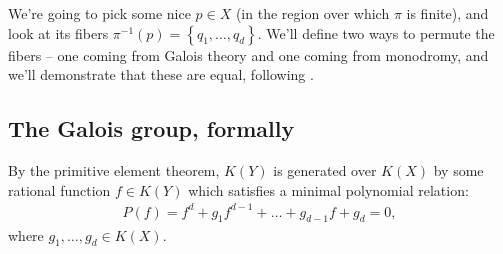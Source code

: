 \documentclass[11pt]{amsart}
\begin{document}
We're going to pick some nice $p \in X$ (in the region over which $\pi$ is finite), and look at its fibers $\pi^{-1}(p) = \left\{ q_1, \ldots, q_d \right\}$. We'll define two ways to permute the fibers -- one coming from Galois theory and one coming from monodromy, and we'll demonstrate that these are equal, following \cite[\S1]{Harris-Galois}.

\subsection{The Galois group, formally}

By the primitive element theorem, $K(Y)$ is generated over $K(X)$ by some rational function $f \in K(Y)$ which satisfies a minimal polynomial relation:
\begin{align*}
    P(f) = f^d + g_1 f^{d-1} + \ldots + g_{d-1}f + g_d = 0,
\end{align*}
where $g_1, \ldots, g_d\in K(X)$.
\end{document}
